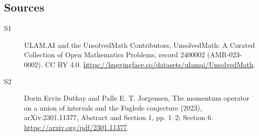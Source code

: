 \documentclass[11pt]{article}
\begin{document}
\subsection{Sources}
\begin{description}
\item[\hypertarget{source:2400002:1}{S1}] ULAM.AI and the UnsolvedMath Contributors, UnsolvedMath: A Curated Collection of Open Mathematics Problems, record 2400002 (AMR-023-0002). CC BY 4.0. \url{https://huggingface.co/datasets/ulamai/UnsolvedMath}.
\item[\hypertarget{source:2400002:2}{S2}] Dorin Ervin Dutkay and Palle E. T. Jorgensen, The momentum operator on a union of intervals and the Fuglede conjecture (2023), arXiv:2301.11377, Abstract and Section 1, pp. 1–2; Section 6. \url{https://arxiv.org/pdf/2301.11377}.
\end{description}
\label{end:2400002}
\end{document}
